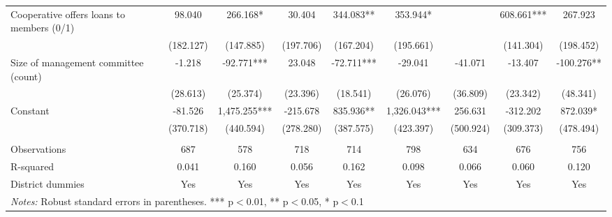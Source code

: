 \documentclass[11pt]{article}
\begin{document}
\begin{landscape}
\begin{table}[H]
{\begin{tabularx}{1.8\linewidth}{lcccccccc}
Cooperative offers loans to members (0/1) & 98.040 & 266.168* & 30.404 & 344.083** & 353.944* &  & 608.661*** & 267.923 \\
 & (182.127) & (147.885) & (197.706) & (167.204) & (195.661) &  & (141.304) & (198.452) \\
Size of management committee (count) & -1.218 & -92.771*** & 23.048 & -72.711*** & -29.041 & -41.071 & -13.407 & -100.276** \\
 & (28.613) & (25.374) & (23.396) & (18.541) & (26.076) & (36.809) & (23.342) & (48.341) \\
Constant & -81.526 & 1,475.255*** & -215.678 & 835.936** & 1,326.043*** & 256.631 & -312.202 & 872.039* \\
 & (370.718) & (440.594) & (278.280) & (387.575) & (423.397) & (500.924) & (309.373) & (478.494) \\
 &  &  &  &  &  &  &  &  \\
Observations & 687 & 578 & 718 & 714 & 798 & 634 & 676 & 756 \\
R-squared & 0.041 & 0.160 & 0.056 & 0.162 & 0.098 & 0.066 & 0.060 & 0.120 \\
 District dummies & Yes & Yes & Yes & Yes & Yes & Yes & Yes & Yes \\ \hline
\multicolumn{9}{l}{\textit{Notes:} Robust standard errors in parentheses. *** p$<$0.01, ** p$<$0.05, * p$<$0.1} \\
  \end{tabularx}}
\end{table}
\doublespacing

\end{landscape}

\newpage

\end{document}
